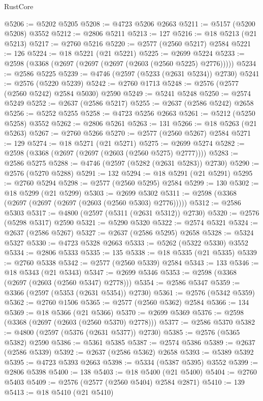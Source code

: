 \begin{lexlean}{RustCore}
\begin{coremodule}
@5206 := @5202 @5205
@5208 := @4723 @5206 @2663
@5211 := @5157 (@5200 @5208) @3552
@5212 := @2806 @5211
@5213 := 127
@5216 := @18 @5213 (@21 @5213)
@5217 := @2760 @5216
@5220 := @2577 (@2560 @5217) @2584
@5221 := 126
@5224 := @18 @5221 (@21 @5221)
@5225 := @2699 @5224
@5233 := @2598 (@3368 (@2697 (@2697 (@2697 (@2603 (@2560 @5225) @2776)))))
@5234 := @2586 @5225
@5239 := @4746 (@2597 (@5233 (@2631 @5234)) @2730)
@5241 := @2576 (@5220 @5239)
@5242 := @2760 @1713
@5248 := @2576 (@2577 (@2560 @5242) @2584 @5030) @2590
@5249 := @5241 @5248
@5250 := @2574 @5249
@5252 := @2637 (@2586 @5217)
@5255 := @2637 (@2586 @5242) @2658
@5256 := @5252 @5255
@5258 := @4723 @5256 @2663
@5261 := @5212 (@5250 @5258) @3552
@5262 := @2806 @5261
@5263 := 131
@5266 := @18 @5263 (@21 @5263)
@5267 := @2760 @5266
@5270 := @2577 (@2560 @5267) @2584
@5271 := 129
@5274 := @18 @5271 (@21 @5271)
@5275 := @2699 @5274
@5282 := @2598 (@3368 (@2697 (@2697 (@2603 (@2560 @5275) @2777))))
@5283 := @2586 @5275
@5288 := @4746 (@2597 (@5282 (@2631 @5283)) @2730)
@5290 := @2576 (@5270 @5288)
@5291 := 132
@5294 := @18 @5291 (@21 @5291)
@5295 := @2760 @5294
@5298 := @2577 (@2560 @5295) @2584
@5299 := 130
@5302 := @18 @5299 (@21 @5299)
@5303 := @2699 @5302
@5311 := @2598 (@3368 (@2697 (@2697 (@2697 (@2603 (@2560 @5303) @2776)))))
@5312 := @2586 @5303
@5317 := @4800 (@2597 (@5311 (@2631 @5312)) @2730)
@5320 := @2576 (@5298 @5317) @2590
@5321 := @5290 @5320
@5322 := @2574 @5321
@5324 := @2637 (@2586 @5267)
@5327 := @2637 (@2586 @5295) @2658
@5328 := @5324 @5327
@5330 := @4723 @5328 @2663
@5333 := @5262 (@5322 @5330) @3552
@5334 := @2806 @5333
@5335 := 135
@5338 := @18 @5335 (@21 @5335)
@5339 := @2760 @5338
@5342 := @2577 (@2560 @5339) @2584
@5343 := 133
@5346 := @18 @5343 (@21 @5343)
@5347 := @2699 @5346
@5353 := @2598 (@3368 (@2697 (@2603 (@2560 @5347) @2778)))
@5354 := @2586 @5347
@5359 := @3366 (@2597 (@5353 (@2631 @5354)) @2730)
@5361 := @2576 (@5342 @5359)
@5362 := @2760 @1506
@5365 := @2577 (@2560 @5362) @2584
@5366 := 134
@5369 := @18 @5366 (@21 @5366)
@5370 := @2699 @5369
@5376 := @2598 (@3368 (@2697 (@2603 (@2560 @5370) @2778)))
@5377 := @2586 @5370
@5382 := @4800 (@2597 (@5376 (@2631 @5377)) @2730)
@5385 := @2576 (@5365 @5382) @2590
@5386 := @5361 @5385
@5387 := @2574 @5386
@5389 := @2637 (@2586 @5339)
@5392 := @2637 (@2586 @5362) @2658
@5393 := @5389 @5392
@5395 := @4723 @5393 @2663
@5398 := @5334 (@5387 @5395) @3552
@5399 := @2806 @5398
@5400 := 138
@5403 := @18 @5400 (@21 @5400)
@5404 := @2760 @5403
@5409 := @2576 (@2577 (@2560 @5404) @2584 @2871)
@5410 := 139
@5413 := @18 @5410 (@21 @5410)

\end{coremodule}
\end{lexlean}
